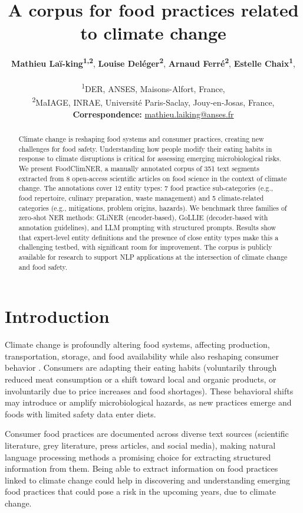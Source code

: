 \documentclass[11pt]{article}
\title{A corpus for food practices related to climate change}
\author{
  \textbf{Mathieu Laï-king\textsuperscript{1,2}},
  \textbf{Louise Deléger\textsuperscript{2}},
  \textbf{Arnaud Ferré\textsuperscript{2}},
  \textbf{Estelle Chaix\textsuperscript{1}},
\\
\\
  \textsuperscript{1}DER, ANSES, Maisons-Alfort, France, \\
  \textsuperscript{2}MaIAGE, INRAE, Université Paris-Saclay, Jouy‑en‑Josas, France,
\\
  \small{
    \textbf{Correspondence:} \href{mailto:mathieu.laiking@anses.fr}{mathieu.laiking@anses.fr}
  }
}
\begin{document}
\maketitle
\begin{abstract}
Climate change is reshaping food systems and consumer practices, creating new challenges for food safety. Understanding how people modify their eating habits in response to climate disruptions is critical for assessing emerging microbiological risks. We present FoodClimNER, a manually annotated corpus of 351 text segments extracted from 8 open-access scientific articles on food science in the context of climate change. The annotations cover 12 entity types: 7 food practice sub-categories (e.g., food repertoire, culinary preparation, waste management) and 5 climate-related categories (e.g., mitigations, problem origins, hazards). We benchmark three families of zero-shot NER methods: GLiNER (encoder-based), GoLLIE (decoder-based with annotation guidelines), and LLM prompting with structured prompts. Results show that expert-level entity definitions and the presence of close entity types make this a challenging testbed, with significant room for improvement. The corpus is publicly available for research to support NLP applications at the intersection of climate change and food safety.
\end{abstract}

\section{Introduction}

Climate change is profoundly altering food systems, affecting production, transportation, storage, and food availability while also reshaping consumer behavior \cite{}. Consumers are adapting their eating habits (voluntarily through reduced meat consumption or a shift toward local and organic products, or involuntarily due to price increases and food shortages). These behavioral shifts may introduce or amplify microbiological hazards, as new practices emerge and foods with limited safety data enter diets. %

Consumer food practices are documented across diverse text sources (scientific literature, grey literature, press articles, and social media), making natural language processing methods a promising choice for extracting structured information from them. Being able to extract information on food practices linked to climate change could help in discovering and understanding emerging food practices that could pose a risk in the upcoming years, due to climate change. %
\end{document}
